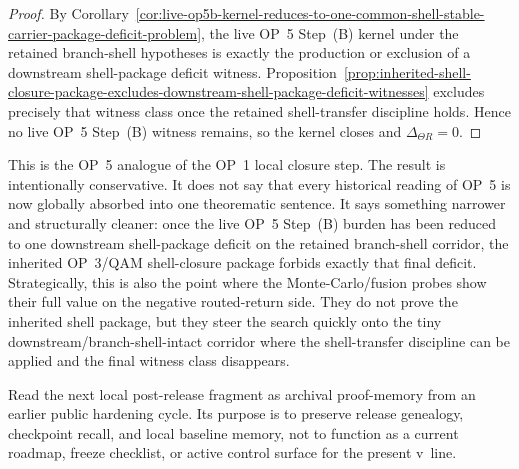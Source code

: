 \begin{proof}
By Corollary~\ref{cor:live-op5b-kernel-reduces-to-one-common-shell-stable-carrier-package-deficit-problem}, the live OP~5 Step~(B) kernel under the retained branch-shell hypotheses is exactly the production or exclusion of a downstream shell-package deficit witness. Proposition~\ref{prop:inherited-shell-closure-package-excludes-downstream-shell-package-deficit-witnesses} excludes precisely that witness class once the retained shell-transfer discipline holds. Hence no live OP~5 Step~(B) witness remains, so the kernel closes and \(\Delta_{\Theta R}=0\).
\end{proof}

\begin{remark}
\label{rem:what-sixth-op5b-sharpening-buys}
This is the OP~5 analogue of the OP~1 local closure step. The result is intentionally conservative. It does not say that every historical reading of OP~5 is now globally absorbed into one theorematic sentence. It says something narrower and structurally cleaner: once the live OP~5 Step~(B) burden has been reduced to one downstream shell-package deficit on the retained branch-shell corridor, the inherited OP~3/QAM shell-closure package forbids exactly that final deficit. Strategically, this is also the point where the Monte-Carlo/fusion probes show their full value on the negative routed-return side. They do not prove the inherited shell package, but they steer the search quickly onto the tiny downstream/branch-shell-intact corridor where the shell-transfer discipline can be applied and the final witness class disappears.
\end{remark}
\begin{remark}
Read the next local post-release fragment as archival proof-memory from an earlier public hardening cycle. Its purpose is to preserve release genealogy, checkpoint recall, and local baseline memory, not to function as a current roadmap, freeze checklist, or active control surface for the present v\docversion\ line.
\end{remark}

